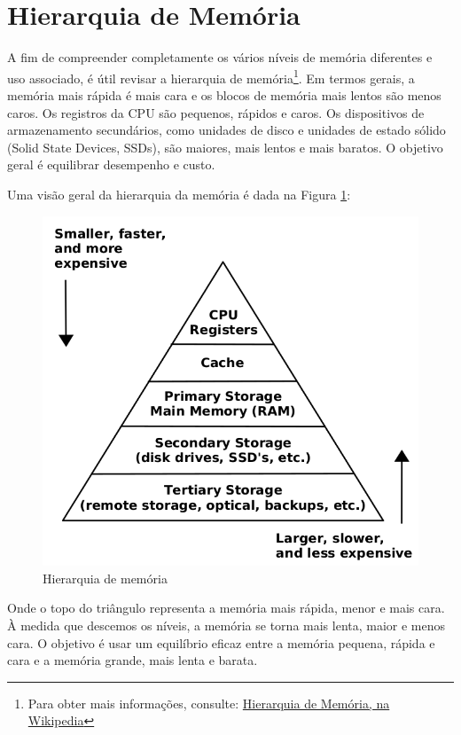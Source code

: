 \section{Hierarquia de Memória}
A fim de compreender completamente os vários níveis de memória diferentes e uso associado, é útil revisar a hierarquia de memória\footnote{Para obter mais informações, consulte: \href{https://pt.wikipedia.org/wiki/Hierarquia\_de\_mem\%C3\%B3ria}{Hierarquia de Memória, na Wikipedia}}. Em termos gerais, a memória mais rápida é mais cara e os blocos de memória mais lentos são menos caros. Os registros da CPU são pequenos, rápidos e caros. Os dispositivos de armazenamento secundários, como unidades de disco e unidades de estado sólido (Solid State Devices, SSDs), são maiores, mais lentos e mais baratos. O objetivo geral é equilibrar desempenho e custo.

Uma visão geral da hierarquia da memória é dada na Figura \ref{fig:hierarquia}:
\begin{figure}[ht]
	\begin{center}
		\includegraphics[width=0.8\linewidth]{imagens/hierarquia}
	\end{center}
	\caption{Hierarquia de memória}
	\label{fig:hierarquia}
\end{figure}

Onde o topo do triângulo representa a memória mais rápida, menor e mais cara. À medida que descemos os níveis, a memória se torna mais lenta, maior e menos cara. O objetivo é usar um equilíbrio eficaz entre a memória pequena, rápida e cara e a memória grande, mais lenta e barata.


